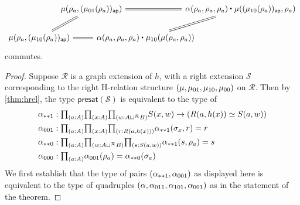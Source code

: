 \begin{thm}
\begin{enumerate}
\begin{equation*}
\begin{tikzcd}[column sep=-2em]
& \mu(\rho_a,(\mu_{01}(\rho_a))_{\mathsf{ap}}) \arrow[dl,equals] & & & \ct{\alpha(\rho_a,\rho_a,\rho_a)}{\mu((\mu_{10}(\rho_a))_{\mathsf{ap}},\rho_a)} \arrow[dl,equals] \arrow[from=lll,crossing over,equals] \\
\mu(\rho_a,(\mu_{10}(\rho_a))_{\mathsf{ap}}) \arrow[rrr,equals] & & & \ct{\alpha(\rho_a,\rho_a,\rho_a)}{\mu_{10}(\mu(\rho_a,\rho_a))}
\end{tikzcd}
\end{equation*}
commutes.
\end{enumerate}
\end{thm}

\begin{proof}
Suppose $\mathcal{R}$ is a graph extension of $h$, with a right extension $\mathcal{S}$ corresponding to the right H-relation structure ${\mathopen{}(\mu,\mu_{01},\mu_{10},\mu_{00})\mathclose{}}$ on $\mathcal{R}$. Then by \autoref{thm:hrel}, the type $\mathsf{presat}(\mathcal{S})$ is equivalent to the type of
\begin{align*}
\alpha_{\ast\ast 1} & : \prd{a:A}{x:A}{w:A\sqcup^{\mathcal{R}}B} S(x,w)\to (R(a,h(x)) \eqvsym S(a,w)) \\
\alpha_{001} & : \prd{a:A}{x:A}{r:R(a,h(x))} \alpha_{\ast\ast 1}(\sigma_x,r)=r \\
\alpha_{\ast\ast 0} & : \prd{a:A}{w:A\sqcup^{\mathcal{R}} B}{s:S(a,w)} \alpha_{\ast\ast 1}(s,\rho_a)=s \\
\alpha_{000} & : \prd{a:A} \alpha_{001}(\rho_a)=\alpha_{\ast\ast 0}(\sigma_a)
\end{align*}
We first establish that the type of pairs ${\mathopen{}(\alpha_{\ast\ast 1},\alpha_{001})\mathclose{}}$ as displayed here is equivalent to the type of quadruples ${\mathopen{}(\alpha,\alpha_{011},\alpha_{101},\alpha_{001})\mathclose{}}$ as in the statement of the theorem.


\end{proof}
